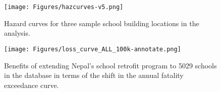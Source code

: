 \documentclass[utf8]{frontiersSCNS} %
\begin{document}
\begin{figure}[h!] 
\begin{center}
    \texttt{[image: Figures/hazcurves-v5.png]}
	\caption{Hazard curves for three sample school building locations in the analysis.}
	\label{fig:hazcurve}
\end{center}
\end{figure}


\begin{figure}[h!] 
\begin{center}
    \texttt{[image: Figures/loss\_curve\_ALL\_100k-annotate.png]}
	\caption{Benefits of extending Nepal's school retrofit program to 5029 schools in the database in terms of the shift in the annual fatality exceedance curve.}
	\label{fig:losscurve}
\end{center}
\end{figure}
\end{document}
